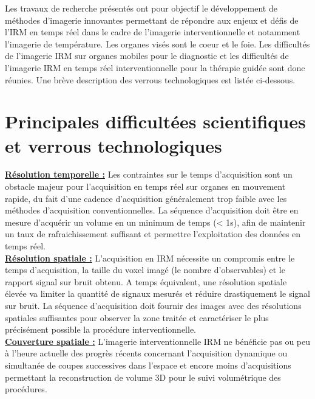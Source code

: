 \documentclass[10pt,a4paper]{report}
\begin{document}
Les travaux de recherche présentés ont pour objectif le développement de méthodes d’imagerie innovantes permettant de répondre aux enjeux et défis de l’IRM en temps réel dans le cadre de l’imagerie interventionnelle et notamment l’imagerie de température. Les organes visés sont le coeur et le foie. Les difficultés de l’imagerie IRM sur organes mobiles pour le diagnostic et les difficultés de l’imagerie IRM en temps réel interventionnelle pour la thérapie guidée sont donc réunies. Une brève description des verrous technologiques est listée ci-dessous.

\section{Principales difficultées scientifiques et verrous technologiques}
\label{chap1-verrous}

\underline{\textbf{Résolution temporelle :}} Les contraintes sur le temps d’acquisition sont un obstacle majeur pour l’acquisition en temps réel sur organes en mouvement rapide, du fait d’une cadence d’acquisition généralement trop faible avec les méthodes d’acquisition conventionnelles. La séquence d’acquisition doit être en mesure d’acquérir un volume en un minimum de temps (< 1s), afin de maintenir un taux de rafraichissement suffisant et permettre l’exploitation des données en temps réel.\\

\underline{\textbf{Résolution spatiale :}} L’acquisition en IRM nécessite un compromis entre le temps d’acquisition, la taille du voxel imagé (le nombre d’observables) et le rapport signal sur bruit obtenu. A temps équivalent, une résolution spatiale élevée va limiter la quantité de signaux mesurés et réduire drastiquement le signal sur bruit. La séquence d’acquisition doit fournir des images avec des résolutions spatiales suffisantes pour observer la zone traitée et caractériser le plus précisément possible la procédure interventionnelle.\\

\underline{\textbf{Couverture spatiale :}} L’imagerie interventionnelle IRM ne bénéficie pas ou peu à l’heure actuelle des progrès récents concernant l’acquisition dynamique ou simultanée de coupes successives dans l’espace et encore moins d’acquisitions permettant la reconstruction de volume 3D pour le suivi volumétrique des procédures.\\
\end{document}
